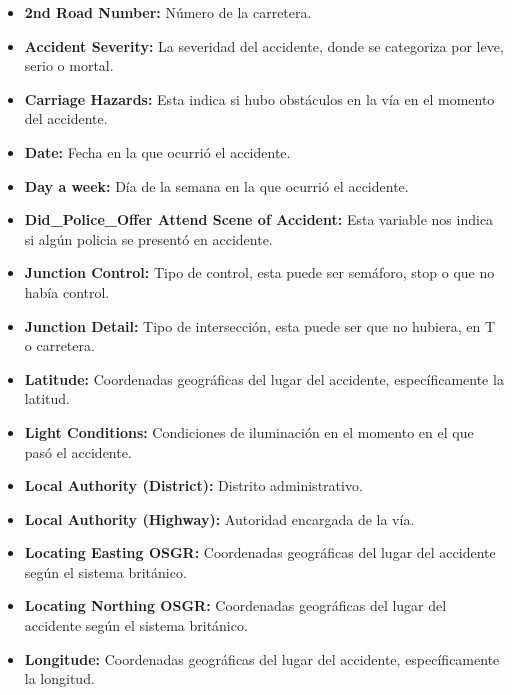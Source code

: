 \documentclass[12pt]{article}
\begin{document}
\begin{itemize}
\begin{itemize}
\item \textbf{2nd Road Number:} Número de la carretera. 

\item \textbf{Accident Severity:} La severidad del accidente, donde se categoriza por leve, serio o mortal.

\item \textbf{Carriage Hazards:}  Esta indica si hubo obstáculos en la vía en el momento del accidente. 

\item \textbf{Date:} Fecha en la que ocurrió el accidente. 

\item \textbf{Day a week:} Día de la semana en la que ocurrió el accidente. 

\item \textbf{Did\_Police\_Offer Attend Scene of Accident:} Esta variable nos indica si algún policia se presentó en accidente. 

\item \textbf{Junction Control:} Tipo de control, esta puede ser semáforo, stop o que no había control. 

\item \textbf{Junction Detail:} Tipo de intersección, esta puede ser que no hubiera, en T o carretera.

\item \textbf{Latitude:} Coordenadas geográficas del lugar del accidente, específicamente la latitud. 

\item \textbf{Light Conditions:} Condiciones de iluminación en el momento en el que pasó el accidente.

\item \textbf{Local Authority (District):} Distrito administrativo. 

\item \textbf{Local Authority (Highway):} Autoridad encargada de la vía. 

\item \textbf{Locating Easting OSGR:} Coordenadas geográficas del lugar del accidente según el sistema británico. 

\item \textbf{Locating Northing OSGR:} Coordenadas geográficas del lugar del accidente según el sistema británico. 

\item \textbf{Longitude:} Coordenadas geográficas del lugar del accidente, específicamente la longitud. 


\end{itemize}
\end{itemize}
\end{document}
